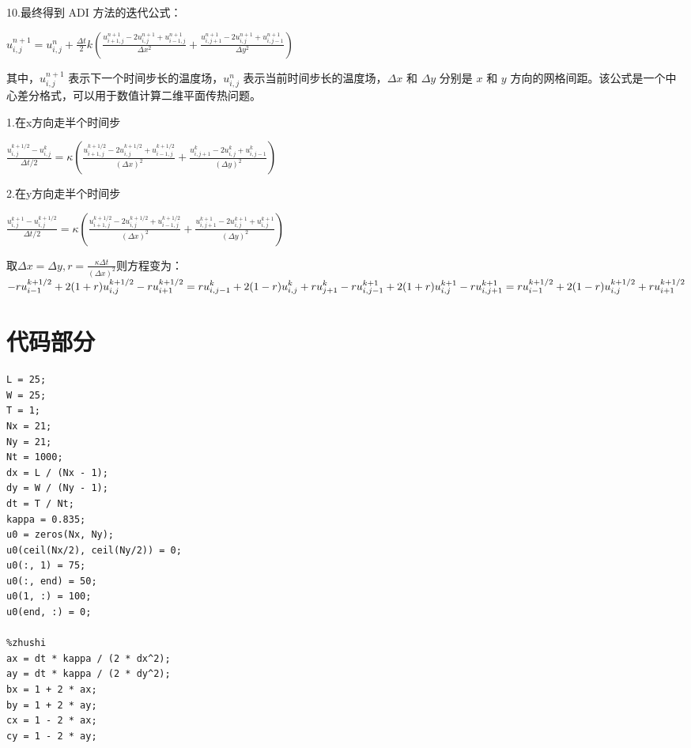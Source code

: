 \documentclass[12pt, a4paper, oneside]{ctexart}
\begin{document}
\begin{spacing}{2.0}
10.最终得到 ADI 方法的迭代公式：
\begin{center}
    $\displaystyle u^{n+1}_{i,j} = u^{n}_{i,j} + \frac{\Delta t}{2} k\left(\frac{u^{n+1}_{i+1,j} - 2u^{n+1}_{i,j} + u^{n+1}_{i-1,j}}{\Delta x^2} + \frac{u^{n+1}_{i,j+1} - 2u^{n+1}_{i,j} + u^{n+1}_{i,j-1}}{\Delta y^2}\right)$
\end{center}

其中，$u^{n+1}_{i,j}$ 表示下一个时间步长的温度场，$u^{n}_{i,j}$ 表示当前时间步长的温度场，$\Delta x$ 和 $\Delta y$ 分别是 $x$ 和 $y$ 方向的网格间距。该公式是一个中心差分格式，可以用于数值计算二维平面传热问题。



1.在x方向走半个时间步
\begin{center}
    $\displaystyle \frac{u_{i,j}^{k+1/2}-u_{i,j}^{k}}{\Delta t/2}=\kappa\left(\frac{u_{i+1,j}^{k+1/2}-2u_{i,j}^{k+1/2}+u_{i-1,j}^{k+1/2}}{\left(\Delta x\right)^{2}}+\frac{u_{i,j+1}^{k}-2u_{i,j}^{k}+u_{i,j-1}^{k}}{\left(\Delta y\right)^{2}}\right)$
\end{center}
2.在y方向走半个时间步
\begin{center}
    $\displaystyle \frac{u_{i,j}^{k+1}-u_{i,j}^{k+1/2}}{\Delta t/2}=\kappa\left(\frac{u_{i+1,j}^{k+1/2}-2u_{i,j}^{k+1/2}+u_{i-1,j}^{k+1/2}}{\left(\Delta x\right)^{2}}+\frac{u_{i,j+1}^{k+1}-2u_{i,j}^{k+1}+u_{i,j}^{k+1}}{\left(\Delta y\right)^{2}}\right)$
\end{center}
取$\displaystyle \Delta x=\Delta y,r=\frac{\kappa\Delta t}{\left(\Delta x\right)^{2}}$则方程变为：\\
$\displaystyle -ru_{i-1}^{k+1/2}+2(1+r)u_{i,j}^{k+1/2}-ru_{i+1}^{k+1/2}=ru_{i,j-1}^{k}+2(1-r)u_{i,j}^{k}+ru_{j+1}^{k}\\ -ru_{i,j-1}^{k+1}+2(1+r)u_{i,j}^{k+1}-ru_{i,j+1}^{k+1}=ru_{i-1}^{k+1/2}+2(1-r)u_{i,j}^{k+1/2}+ru_{i+1}^{k+1/2}$



\section{代码部分}

\begin{lstlisting}
L = 25;
W = 25; 
T = 1;
Nx = 21;
Ny = 21; 
Nt = 1000;
dx = L / (Nx - 1);
dy = W / (Ny - 1); 
dt = T / Nt; 
kappa = 0.835;
u0 = zeros(Nx, Ny);
u0(ceil(Nx/2), ceil(Ny/2)) = 0;
u0(:, 1) = 75; 
u0(:, end) = 50;
u0(1, :) = 100;
u0(end, :) = 0; 

%zhushi
ax = dt * kappa / (2 * dx^2);
ay = dt * kappa / (2 * dy^2);
bx = 1 + 2 * ax;
by = 1 + 2 * ay;
cx = 1 - 2 * ax;
cy = 1 - 2 * ay;


\end{lstlisting}
\end{spacing}
\end{document}
